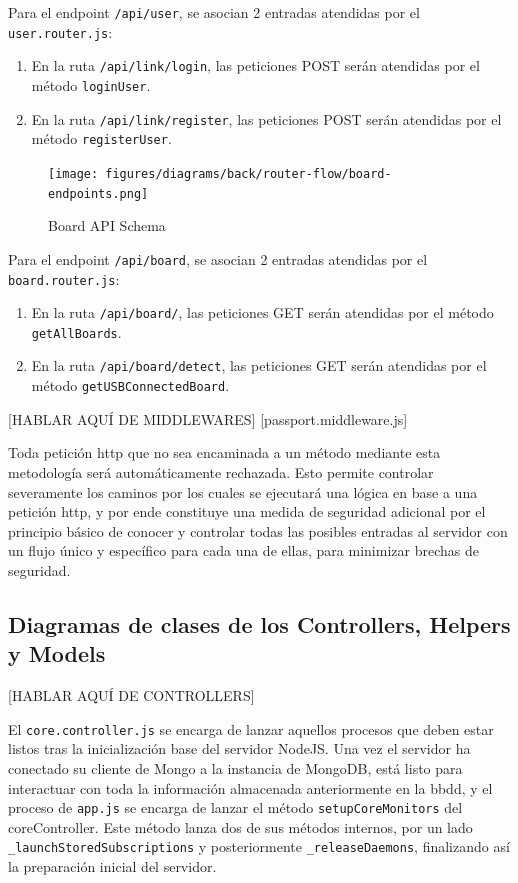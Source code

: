 Para el endpoint \verb|/api/user|, se asocian 2 entradas atendidas por el \verb|user.router.js|:
\begin{enumerate}
\item En la ruta \verb|/api/link/login|, las peticiones POST serán atendidas por el método \verb|loginUser|.
\item En la ruta \verb|/api/link/register|, las peticiones POST serán atendidas por el método \verb|registerUser|.
\end{enumerate}

\begin{figure}[hbt!]
\centering
\texttt{[image: figures/diagrams/back/router-flow/board-endpoints.png]}
\caption[board-endpoints]{Board API Schema\footnotemark}
\end{figure}

Para el endpoint \verb|/api/board|, se asocian 2 entradas atendidas por el \verb|board.router.js|:
\begin{enumerate}
\item En la ruta \verb|/api/board/|, las peticiones GET serán atendidas por el método \verb|getAllBoards|.
\item En la ruta \verb|/api/board/detect|, las peticiones GET serán atendidas por el método \verb|getUSBConnectedBoard|.
\end{enumerate}

[HABLAR AQUÍ DE MIDDLEWARES]
[passport.middleware.js]


Toda petición http que no sea encaminada a un método mediante esta metodología será automáticamente rechazada. Esto permite controlar severamente los caminos por los cuales se ejecutará una lógica en base a una petición http, y por ende constituye una medida de seguridad adicional por el principio básico de conocer y controlar todas las posibles entradas al servidor con un flujo único y específico para cada una de ellas, para minimizar brechas de seguridad.

\subsection{Diagramas de clases de los Controllers, Helpers y Models}
\label{makereference4.6.4}

[HABLAR AQUÍ DE CONTROLLERS]

El \verb|core.controller.js| se encarga de lanzar aquellos procesos que deben estar listos tras la inicialización base del servidor NodeJS. Una vez el servidor ha conectado su cliente de Mongo a la instancia de MongoDB, está listo para interactuar con toda la información almacenada anteriormente en la \gls{bbdd}, y el proceso de \verb|app.js| se encarga de lanzar el método \verb|setupCoreMonitors| del coreController. Este método lanza dos de sus métodos internos, por un lado \verb|_launchStoredSubscriptions| y posteriormente \verb|_releaseDaemons|, finalizando así la preparación inicial del servidor.

